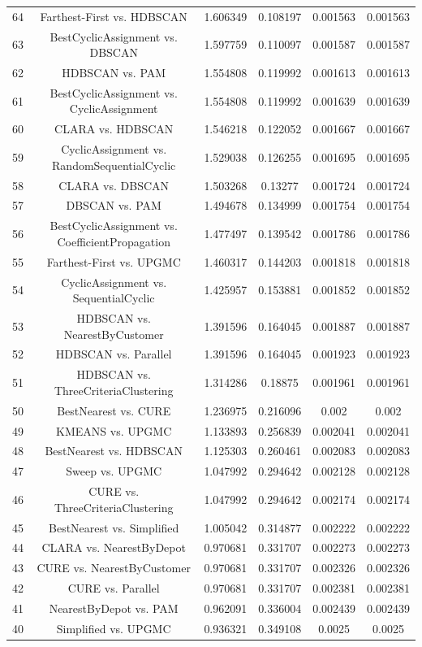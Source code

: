 \documentclass[a4paper,10pt]{article}
\begin{document}
\begin{landscape}
\begin{table}[!htp]
\begin{tabular}{cccccc}
64&Farthest-First vs. HDBSCAN&1.606349&0.108197&0.001563&0.001563\\
63&BestCyclicAssignment vs. DBSCAN&1.597759&0.110097&0.001587&0.001587\\
62&HDBSCAN vs. PAM&1.554808&0.119992&0.001613&0.001613\\
61&BestCyclicAssignment vs. CyclicAssignment&1.554808&0.119992&0.001639&0.001639\\
60&CLARA vs. HDBSCAN&1.546218&0.122052&0.001667&0.001667\\
59&CyclicAssignment vs. RandomSequentialCyclic&1.529038&0.126255&0.001695&0.001695\\
58&CLARA vs. DBSCAN&1.503268&0.13277&0.001724&0.001724\\
57&DBSCAN vs. PAM&1.494678&0.134999&0.001754&0.001754\\
56&BestCyclicAssignment vs. CoefficientPropagation&1.477497&0.139542&0.001786&0.001786\\
55&Farthest-First vs. UPGMC&1.460317&0.144203&0.001818&0.001818\\
54&CyclicAssignment vs. SequentialCyclic&1.425957&0.153881&0.001852&0.001852\\
53&HDBSCAN vs. NearestByCustomer&1.391596&0.164045&0.001887&0.001887\\
52&HDBSCAN vs. Parallel&1.391596&0.164045&0.001923&0.001923\\
51&HDBSCAN vs. ThreeCriteriaClustering&1.314286&0.18875&0.001961&0.001961\\
50&BestNearest vs. CURE&1.236975&0.216096&0.002&0.002\\
49&KMEANS vs. UPGMC&1.133893&0.256839&0.002041&0.002041\\
48&BestNearest vs. HDBSCAN&1.125303&0.260461&0.002083&0.002083\\
47&Sweep vs. UPGMC&1.047992&0.294642&0.002128&0.002128\\
46&CURE vs. ThreeCriteriaClustering&1.047992&0.294642&0.002174&0.002174\\
45&BestNearest vs. Simplified&1.005042&0.314877&0.002222&0.002222\\
44&CLARA vs. NearestByDepot&0.970681&0.331707&0.002273&0.002273\\
43&CURE vs. NearestByCustomer&0.970681&0.331707&0.002326&0.002326\\
42&CURE vs. Parallel&0.970681&0.331707&0.002381&0.002381\\
41&NearestByDepot vs. PAM&0.962091&0.336004&0.002439&0.002439\\
40&Simplified vs. UPGMC&0.936321&0.349108&0.0025&0.0025\\

\end{tabular}
\end{table}
\end{landscape}
\end{document}
